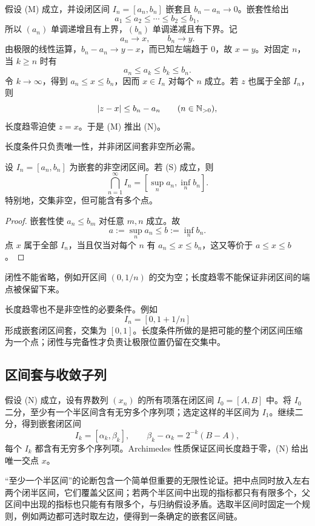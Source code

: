 假设 (M) 成立，并设闭区间 \(I_n=[a_n,b_n]\) 嵌套且 \(b_n-a_n\to0\)。嵌套性给出
\[
 a_1\le a_2\le\cdots\le b_2\le b_1,
\]
所以 \((a_n)\) 单调递增且有上界，\((b_n)\) 单调递减且有下界。记
\[
 a_n\to x,\qquad b_n\to y.
\]
由极限的线性运算，\(b_n-a_n\to y-x\)，而已知左端趋于 \(0\)，故 \(x=y\)。对固定 \(n\)，当 \(k\ge n\) 时有
\[
 a_n\le a_k\le b_k\le b_n.
\]
令 \(k\to\infty\)，得到 \(a_n\le x\le b_n\)，因而 \(x\in I_n\) 对每个 \(n\) 成立。若 \(z\) 也属于全部 \(I_n\)，则
\[
 |z-x|\le b_n-a_n\qquad(n\in\mathbb{N}_{>0}),
\]
长度趋零迫使 \(z=x\)。于是 (M) 推出 (N)。

长度条件只负责唯一性，并非闭区间套非空所必需。

\begin{proposition}[一般闭区间套]
设 \(I_n=[a_n,b_n]\) 为嵌套的非空闭区间。若 (S) 成立，则
\[
 \bigcap_{n=1}^{\infty}I_n
 =\left[\sup_n a_n,\inf_n b_n\right].
\]
特别地，交集非空，但可能含有多个点。
\end{proposition}

\begin{proof}
嵌套性使 \(a_n\le b_m\) 对任意 \(m,n\) 成立。故
\[
 a:=\sup_n a_n\le b:=\inf_n b_n.
\]
点 \(x\) 属于全部 \(I_n\)，当且仅当对每个 \(n\) 有 \(a_n\le x\le b_n\)，这又等价于 \(a\le x\le b\)。
\end{proof}

闭性不能省略，例如开区间 \((0,1/n)\) 的交为空；长度趋零不能保证非闭区间的端点被保留下来。

长度趋零也不是非空性的必要条件。例如
\[
 I_n=[0,1+1/n]
\]
形成嵌套闭区间套，交集为 \([0,1]\)。长度条件所做的是把可能的整个闭区间压缩为一个点；闭性与完备性才负责让极限位置仍留在交集中。

\subsection{区间套与收敛子列}

假设 (N) 成立，设有界数列 \((x_n)\) 的所有项落在闭区间 \(I_0=[A,B]\) 中。将 \(I_0\) 二分，至少有一个半区间含有无穷多个序列项；选定这样的半区间为 \(I_1\)。继续二分，得到嵌套闭区间
\[
 I_k=[\alpha_k,\beta_k],\qquad
 \beta_k-\alpha_k=2^{-k}(B-A),
\]
每个 \(I_k\) 都含有无穷多个序列项。Archimedes 性质保证区间长度趋于零，(N) 给出唯一交点 \(x\)。

“至少一个半区间”的论断包含一个简单但重要的无限性论证。把中点同时放入左右两个闭半区间，它们覆盖父区间；若两个半区间中出现的指标都只有有限多个，父区间中出现的指标也只能有有限多个，与归纳假设矛盾。选取半区间时固定一个规则，例如两边都可选时取左边，便得到一条确定的嵌套区间链。

